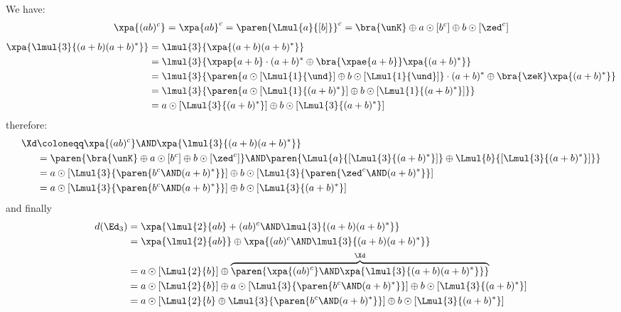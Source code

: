 \documentclass[a4paper,USenglish]{lipics}
\begin{document}
\begin{Example}
  \label{ex:ab:xpn:detailed}
  We have:
  \begin{align*}
    \xpa{(ab)^{c}}
     = \xpa{ab}^{c}
     = \paren{\Lmul{a}{[b]}}^{c}
     = \bra{\unK} \oplus a \odot [b^{c}] \oplus b \odot [\zed^{c}]
  \end{align*}
  \begin{align*}
    \xpa{\lmul{3}{(a+b)(a+b)^*}}
    & = \lmul{3}{\xpa{(a+b)(a+b)^*}}\\
    & = \lmul{3}{\xpap{a+b}\cdot(a+b)^* \oplus \bra{\xpae{a+b}}\xpa{(a+b)^*}} \\
    & = \lmul{3}{\paren{a \odot [\Lmul{1}{\und}] \oplus b \odot [\Lmul{1}{\und}]}\cdot(a+b)^* \oplus \bra{\zeK}\xpa{(a+b)^*}} \\
    & = \lmul{3}{\paren{a \odot [\Lmul{1}{(a+b)^*}] \oplus b \odot [\Lmul{1}{(a+b)^*}]}} \\
    & = a \odot [\Lmul{3}{(a+b)^*}] \oplus b \odot [\Lmul{3}{(a+b)^*}]
  \end{align*}
  therefore:
  \begin{align*}
    \Xd
    & \coloneqq \xpa{(ab)^{c}} \AND \xpa{\lmul{3}{(a+b)(a+b)^*}}\\
    & = \paren{\bra{\unK} \oplus a \odot {[b^{c}] \oplus b \odot [\zed^{c}]}}
      \AND \paren{\Lmul{a}{[\Lmul{3}{(a+b)^*}]} \oplus \Lmul{b}{[\Lmul{3}{(a+b)^*}]}}\\
    & = a \odot [\Lmul{3}{\paren{b^{c} \AND (a+b)^*}}]
      \oplus b \odot [\Lmul{3}{\paren{\zed^{c} \AND (a+b)^*}}]
    \\
    & = a \odot [\Lmul{3}{\paren{b^{c} \AND (a+b)^*}}]
      \oplus b \odot [\Lmul{3}{(a+b)^*}]
  \end{align*}
  and finally
  \begin{align*}
    d(\Ed_3)
    & = \xpa{\lmul{2}{ab} + (ab)^{c} \AND \lmul{3}{(a+b)(a+b)^*}} \\
    & = \xpa{\lmul{2}{ab}} \oplus \xpa{(ab)^{c} \AND \lmul{3}{(a+b)(a+b)^*}}\\
    & = a \odot [\Lmul{2}{b}] \oplus \overbrace{\paren{\xpa{(ab)^{c}} \AND \xpa{\lmul{3}{(a+b)(a+b)^*}}}}^{\Xd} \\
    & = a \odot [\Lmul{2}{b}]
      \oplus a \odot [\Lmul{3}{\paren{b^{c} \AND (a+b)^*}}]
      \oplus b \odot [\Lmul{3}{(a+b)^*}]\\
    & = a \odot [\Lmul{2}{b} \oplus \Lmul{3}{\paren{b^{c} \AND (a+b)^*}}]
      \oplus b \odot [\Lmul{3}{(a+b)^*}]
  \end{align*}
\end{Example}
\end{document}
